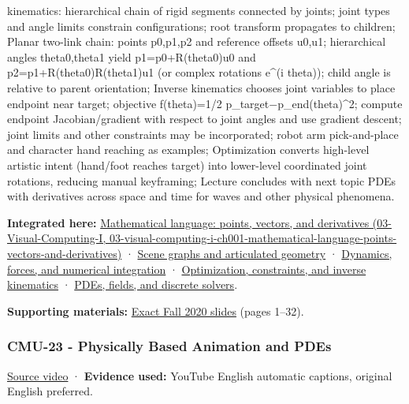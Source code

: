kinematics: hierarchical chain of rigid segments connected by joints; joint types and angle limits constrain configurations; root transform propagates to children; Planar two-link chain: points p0,p1,p2 and reference offsets u0,u1; hierarchical angles theta0,theta1 yield p1=p0+R(theta0)u0 and p2=p1+R(theta0)R(theta1)u1 (or complex rotations e\^{}(i theta)); child angle is relative to parent orientation; Inverse kinematics chooses joint variables to place endpoint near target; objective f(theta)=1/2 \textbar\textbar p\_target−p\_end(theta)\textbar\textbar\^{}2; compute endpoint Jacobian/gradient with respect to joint angles and use gradient descent; joint limits and other constraints may be incorporated; robot arm pick-and-place and character hand reaching as examples; Optimization converts high-level artistic intent (hand/foot reaches target) into lower-level coordinated joint rotations, reducing manual keyframing; Lecture concludes with next topic PDEs with derivatives across space and time for waves and other physical phenomena.

\textbf{Integrated here:} \href{../03-Visual-Computing-I/main.pdf\#nameddest=03-visual-computing-i-ch001-mathematical-language-points-vectors-and-derivatives}{Mathematical language: points, vectors, and derivatives (03-Visual-Computing-I, 03-visual-computing-i-ch001-mathematical-language-points-vectors-and-derivatives)} · \hyperref[04-visual-computing-ii-ch029-scene-graphs-and-articulated-geometry]{Scene graphs and articulated geometry} · \hyperref[04-visual-computing-ii-ch029-dynamics-forces-and-numerical-integration]{Dynamics, forces, and numerical integration} · \hyperref[04-visual-computing-ii-ch029-optimization-constraints-and-inverse-kinematics]{Optimization, constraints, and inverse kinematics} · \hyperref[04-visual-computing-ii-ch030-pdes-fields-and-discrete-solvers]{PDEs, fields, and discrete solvers}.

\textbf{Supporting materials:} \href{https://15462.courses.cs.cmu.edu/fall2020content/lectures/22_optimization/22_optimization_slides.pdf}{Exact Fall 2020 slides} (pages 1--32).

\subsubsection{CMU-23 - Physically Based Animation and PDEs}\label{04-visual-computing-ii-ch036-cmu-23---physically-based-animation-and-pdes}

\href{https://www.youtube.com/watch?v=gqdXsw_Q_as}{Source video} · \textbf{Evidence used:} YouTube English automatic captions, original English preferred.

